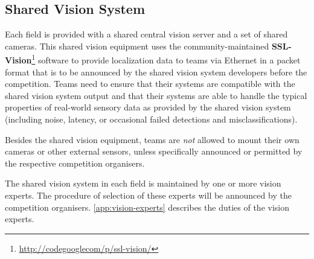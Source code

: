 \subsection{Shared Vision System}
Each field is provided with a shared central vision server and a set of shared
cameras. This shared vision equipment uses the community-maintained
\textbf{SSL-Vision}\footnote{\url{http://codegooglecom/p/ssl-vision/}} software
to provide localization data to teams via Ethernet in a packet format that is to
be announced by the shared vision system developers before the competition.
Teams need to ensure that their systems are compatible with the shared vision
system output and that their systems are able to handle the typical properties
of real-world sensory data as provided by the shared vision system (including
noise, latency, or occasional failed detections and misclassifications).

Besides the shared vision equipment, teams are \emph{not} allowed to mount
their own cameras or other external sensors, unless specifically announced or
permitted by the respective competition organisers.

The shared vision system in each field is maintained by one or more vision
experts. The procedure of selection of these experts will be announced by the
competition organisers. \autoref{app:vision-experts} describes the duties of the
vision experts.

